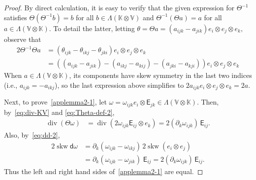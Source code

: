 \documentclass[10pt,a4paper]{amsart}
\newcommand{\EK}{\mathsf{E}}
\newcommand{\K}{\mathbb{K}}
\newcommand{\V}{\mathbb{V}}
\newcommand{\dd}{\mathsf{d}}
\renewcommand\div{\operatorname{div}}
\newcommand{\og}{\omega}
\newcommand\skw{\operatorname{skw}}
\begin{document}
\begin{proof}
  By direct calculation, it is easy to verify that the given
  expression for $\Theta^{-1}$ satisfies $ \Theta (\Theta^{-1} b) = b$
  for all $b \in \Lambda(\K \otimes \V)$ and $ \Theta^{-1} (\Theta a) = a$ for all
  $a \in \Lambda(\V \otimes \K)$. To detail the latter, letting
  $\theta = \Theta a = (a_{ijk} - a_{jik}) e_i \otimes e_j \otimes
  e_k,$ observe that
  \begin{align*}
    2 \Theta^{-1} \Theta a
    &= 
      (\theta_{ijk} - \theta_{ikj} - \theta_{jki}) e_i \otimes e_j \otimes   e_k
    \\
    & =
      ( (a_{ijk} - a_{jik}) - (a_{ikj} - a_{kij}) - (a_{jki} - a_{kji})
      ) e_i \otimes e_j \otimes  e_k
  \end{align*}
  When $a \in \Lambda(\V \otimes \K)$, its components have skew
  symmetry in the last two indices (i.e., $a_{ijk} = -a_{ikj}$), so
  the last expression above simplifies to
  $2a_{ijk} e_i \otimes e_j \otimes e_k = 2a$.

  Next, to prove~\eqref{applemma2-1}, let
  $\og = \omega_{ijk} e_i \otimes \EK_{jk}\in \Lambda( \V \otimes
  \K)$. Then, by~\eqref{eq:div-KV} and \eqref{eq:Theta-def-2}, 
  \begin{align*}
    \div (\Theta \omega)
    &  %
      = \div( 2\omega_{ijk} \EK_{ij} \otimes e_k)
     = 2(\partial_k \omega_{ijk})\, \EK_{ij}.
  \end{align*}
  Also, by~\eqref{eq:dd-2}, 
  \begin{align*}
    2\skw  \dd \omega
    & 
      =  \partial_k (\omega_{ijk} - \omega_{ikj}) \,2 \skw(e_i \otimes e_j)
    \\
    &  = \partial_k (\omega_{ijk} - \omega_{jik}) \; \EK_{ij} 
      = 2(\partial_k \omega_{ijk})\, \EK_{ij}.
  \end{align*}
  Thus the left and right hand sides of~\eqref{applemma2-1} are equal.
\end{proof}
\end{document}
